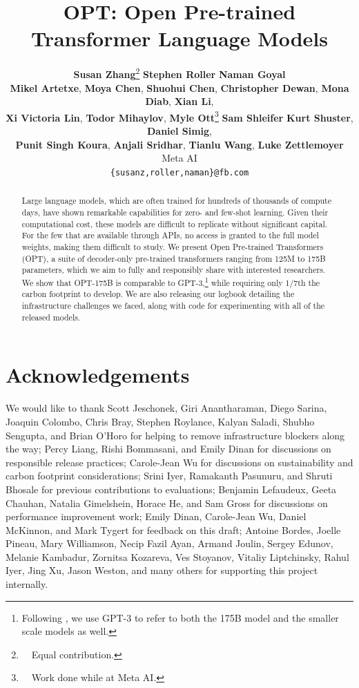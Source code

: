 \documentclass[11pt]{article}
\title{OPT: Open Pre-trained Transformer Language Models}
\author{
{\bf Susan Zhang}\thanks{\ \ Equal contribution.
}\footnotemark[1]{\normalfont ,} 
{\bf Stephen Roller}\footnotemark[1]{\normalfont ,} 
{\bf Naman Goyal}\footnotemark[1]{\normalfont ,} 
\\
{\bf Mikel Artetxe}{\normalfont ,}
{\bf Moya Chen}{\normalfont ,}
{\bf Shuohui Chen}{\normalfont ,}
{\bf Christopher Dewan}{\normalfont ,}
{\bf Mona Diab}{\normalfont ,}
{\bf Xian Li}{\normalfont ,} \\
{\bf Xi Victoria Lin}{\normalfont ,}
{\bf Todor Mihaylov}{\normalfont ,}
{\bf Myle Ott}\thanks{\ \ Work done while at Meta AI.}\footnotemark[2]{\normalfont ,}
{\bf Sam Shleifer}\footnotemark[2]{\normalfont ,} 
{\bf Kurt Shuster}{\normalfont ,} 
{\bf Daniel Simig}{\normalfont ,} \\
{\bf Punit Singh Koura}{\normalfont ,}
{\bf Anjali Sridhar}{\normalfont ,}
{\bf Tianlu Wang}{\normalfont ,}
{\bf Luke Zettlemoyer}{\normalfont } \\
\tablewhitespace
Meta AI\\
\tablewhitespace
\texttt{\{susanz,roller,naman\}@fb.com}
}
\newcommand{\OPT}[0]{{OPT-175B}}
\newcommand{\biggpt}[1]{{GPT-3#1}}
\begin{document}
\maketitle
\begin{abstract}
Large language models, which are often trained for hundreds of thousands of compute days, have shown remarkable capabilities for zero- and few-shot learning. Given their computational cost, these models are difficult to replicate without significant capital.  For the few that are available through APIs, no access is granted to the full model weights, making them difficult to study. We present Open Pre-trained Transformers (OPT), a suite of decoder-only pre-trained transformers ranging from 125M to 175B parameters, which we aim to fully and responsibly share with interested researchers. We show that \OPT{} is comparable to \biggpt{},\footnote{Following \citet{brown2020gpt3}, we use \biggpt{} to  refer to both the 175B model and the smaller scale models as well.} while requiring only 1/7th the carbon footprint to develop.  We are also releasing our logbook detailing the infrastructure challenges we faced, along with code for experimenting with all of the released models.
\end{abstract}











\section*{Acknowledgements}
We would like to thank Scott Jeschonek, Giri Anantharaman, Diego Sarina, Joaquin Colombo, Chris Bray, Stephen Roylance, Kalyan Saladi, Shubho Sengupta, and Brian O'Horo for helping to remove infrastructure blockers along the way; Percy Liang, Rishi Bommasani, and Emily Dinan for discussions on responsible release practices; Carole-Jean Wu for discussions on sustainability and carbon footprint considerations; Srini Iyer, Ramakanth Pasunuru, and Shruti Bhosale for previous contributions to evaluations; Benjamin Lefaudeux, Geeta Chauhan, Natalia Gimelshein, Horace He, and Sam Gross for discussions on performance improvement work; Emily Dinan, Carole-Jean Wu, Daniel McKinnon, and Mark Tygert for feedback on this draft; Antoine Bordes, Joelle Pineau, Mary Williamson, Necip Fazil Ayan, Armand Joulin, Sergey Edunov, Melanie Kambadur, Zornitsa Kozareva, Ves Stoyanov, Vitaliy Liptchinsky, Rahul Iyer, Jing Xu, Jason Weston, and many others for supporting this project internally.




\clearpage
\appendix
\onecolumn





\clearpage

\end{document}
